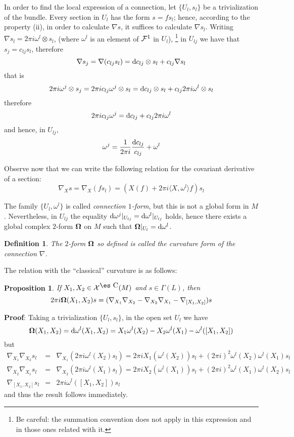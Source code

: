 \documentclass[12pt]{article}
\theoremstyle{plain}
\newtheorem{prop}{Proposition}
\newtheorem{definition}{Definition}
\def\beq{\begin{equation}}
\def\eeq{\end{equation}}
\def\beann{\begin{eqnarray*}}
\def\eeann{\end{eqnarray*}}
\def\qed{\ifvmode\removelastskip\fi
{\unskip\nobreak\hfil\penalty50\hbox{}\nobreak\hfil
\hbox{\vrule height1.2ex width1.2ex}\parfillskip=0pt
\finalhyphendemerits=0 \par\smallskip}}
\def\d{{\rm d}}
\def\curv{{\bf \Omega}}
\def\Complex{\mbox{\es C}}
\begin{document}
In order to find the local expression of a connection,
let $\{ U_l,s_l \}$ be a trivialization of the bundle.
Every section in $U_l$ has the form $s=fs_l$;
hence, according to the property (ii),
in order to calculate $\nabla s$,
it suffices to calculate $\nabla s_l$.
Writing
$\nabla s_l = 2\pi i \omega^l  \otimes s_l$,
(where $\omega^l $ is an element of
${\cal F}^1$ in $U_l$),%
\footnote{
Be careful: the summation convention does not apply in this expression
and
in those ones related with it.
}
in $U_{l j}$ we have that
$s_j = c_{l j}s_l$,
therefore
$$
\nabla s_j =
\nabla (c_{l j}s_l) =
\d c_{l j} \otimes s_l + c_{l j} \nabla s_l
$$
that is
$$
2\pi i \omega^j \otimes s_j =
2\pi i c_{l j} \omega^j \otimes s_l =
\d c_{l j} \otimes s_l + c_{l j} 2\pi i \omega^l  \otimes s_l
$$
therefore
$$
2\pi i c_{l j} \omega^j =
\d c_{l j} + c_{l j} 2\pi i \omega^l
$$
and hence, in $U_{l j}$,
$$
\omega^j =
\frac{1}{2\pi i} \frac{\d c_{l j}}{c_{l j}} + \omega^l
$$

Observe now that we can write the following relation
for the covariant derivative of a section:
\beq
\nabla_X s =
\nabla_X (fs_l) =
(X(f) + 2\pi i \langle X,\omega^l  \rangle f) s_l
\label{expcon}
\eeq

The family
$\{ U_l,\omega^l  \}$
is called
{\it connection $1$-form},
but this is not a global form in $M$.
Nevertheless, in $U_{l j}$
the equality
$\d \omega^j \vert_{U_{l j}} = \d \omega^l  \vert_{U_{l j}}$
holds,
hence there exists a global complex $2$-form
$\curv $ on $M$ such that
$\curv  \vert_{U_l} = \d \omega^l $.

\begin{definition}
The $2$-form $\curv $
so defined is called the
{\rm curvature form} of the connection $\nabla$.
\label{cur}
\end{definition}

The relation with the ``classical'' curvature
is as follows:

\begin{prop}
If $X_1, X_2 \in {\cal X}^{\Complex}(M)$
and $s \in \Gamma (L)$, then
$$
2\pi i \curv  (X_1,X_2)s =
(\nabla_{X_1}\nabla_{X_2} - \nabla_{X_2}\nabla_{X_1} -
\nabla_{[X_1,X_2]})s
$$
\label{clacur}
\end{prop}
{\bf Proof}: 
Taking a trivialization
$\{ U_l,s_l \}$,
in the open set $U_l$ we have
$$
\curv  (X_1,X_2) =
\d \omega^l (X_1,X_2) =
X_1 \omega^l (X_2) - X_2 \omega^l (X_1) - \omega^l  ([X_1,X_2])
$$
but
\beann
\nabla_{X_1} \nabla_{X_2}s_l
&=&
\nabla_{X_1}(2\pi i \omega^l (X_2)s_l)=
2\pi i X_1(\omega^l (X_2))s_l + (2\pi i)^2 \omega^l  (X_2) \omega^l
(X_1)s_l
\\
\nabla_{X_2} \nabla_{X_1}s_l
&=&
\nabla_{X_2}(2\pi i \omega^l (X_1)s_l)=
2\pi i X_2(\omega^l (X_1))s_l + (2\pi i)^2 \omega^l  (X_1) \omega^l
(X_2)s_l
\\
\nabla_{[X_1,X_2]}s_l
&=&
2\pi i \omega^l ([X_1,X_2])s_l
\eeann
and thus the result follows immediately.
\qed
\end{document}
